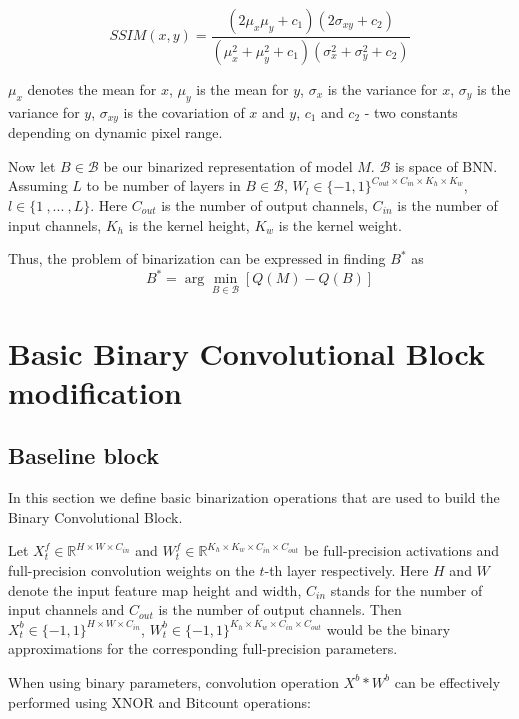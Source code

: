 \documentclass{article}
\begin{document}
\begin{equation}
    SSIM(x, y) = \frac{(2\mu_x\mu_y + c_1)(2\sigma_{xy} + c_2)}{(\mu_x^2 + \mu_y^2 + c_1)(\sigma_{x}^2 + \sigma_{y}^2 + c_2)}
\end{equation}

$\mu_x$ denotes the mean for $x$, $\mu_y$ is the mean for $y$, $\sigma_x$ is the variance for $x$, $\sigma_y$ is the variance for $y$, $\sigma_{xy}$ is the covariation of $x$ and $y$, $c_1$ and $c_2$ - two constants depending on dynamic pixel range.

Now let $B \in \mathcal{B}$ be our binarized representation of model $M$. $\mathcal{B}$ is space of BNN. Assuming $L$ to be number of layers in $B \in \mathcal{B}$, $W_l \in \{-1, 1\}^{C_{out} \times C_{in} \times K_h \times K_w}$, $l \in \{1 \ , ... \ , L\}$. Here $C_{out}$ is the number of output channels, $C_{in}$ is the number of input channels, $K_h$ is the kernel height, $K_w$ is the kernel weight. 


Thus, the problem of binarization can be expressed in finding $B^{*}$ as
\begin{equation}
    B^{*} = \arg\min\limits_{B \in \mathcal{B}} \left[Q(M) - Q(B)\right]
\end{equation}

\section{Basic Binary Convolutional Block modification}
\subsection{Baseline block}

In this section we define basic binarization operations that are used to build the Binary Convolutional Block.

Let $X_t^f \in \mathbb{R}^{H \times W \times C_{in}}$ and $W_t^f \in \mathbb{R}^{K_{h} \times K_{w} \times C_{in} \times C_{out}}$ be full-precision activations and full-precision convolution weights on the $t$-th layer respectively. Here $H$ and $W$ denote the input feature map height and width, $C_{in}$ stands for the number of input channels and $C_{out}$ is the number of output channels. Then $X_t^b \in \{-1, 1\}^{H \times W \times C_{in}}$, $W_t^b \in \{-1, 1\}^{K_{h} \times K_{w} \times C_{in} \times C_{out}}$ would be the binary approximations for the corresponding full-precision parameters.

When using binary parameters, convolution operation $X^b \ast W^b$ can be effectively performed using XNOR and Bitcount operations:
\end{document}
